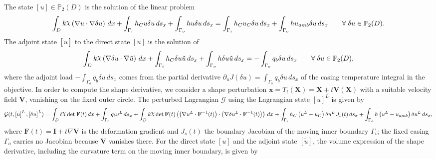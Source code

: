 \documentclass[preview]{standalone}
\let\oldcdot\cdot
\let\cdot\oldcdot
\begin{document}
The state $\left[ u\right] \in \mathbb P_{2}(D)$ is the solution of the linear problem
\begin{dmath*}
\int_{D} k \raisebox{\depth}{$\chi$} \left(  \nabla u  \cdot  \nabla \delta u  \right) \,dx + \int_{\Gamma_i} h_C u \delta u \,ds_x + \int_{\Gamma_o} h u \delta u \,ds_x = \int_{\Gamma_i} h_C u_{C} \delta u \,ds_x + \int_{\Gamma_o} h u_{amb} \delta u \,ds_x \qquad \forall\; {\delta u\in \mathbb P_{2}(D)} .
\end{dmath*}
The adjoint state $\left[ \tilde u\right]$ to the direct state $\left[ u\right]$ is the solution of
\begin{dmath*}
\int_{D} k \raisebox{\depth}{$\chi$} \left(  \nabla \delta u  \cdot  \nabla \tilde u  \right) \,dx + \int_{\Gamma_i} h_C \delta u \tilde u \,ds_x + \int_{\Gamma_o} h \delta u \tilde u \,ds_x = - \int_{\Gamma_o} q_b \delta u \,ds_x \qquad \forall\; {\delta u\in \mathbb P_{2}(D)} ,
\end{dmath*}
where the adjoint load $- \int_{\Gamma_o} q_b \delta u \,ds_x$ comes from the partial derivative $\partial_{u} J(\delta u) = \int_{\Gamma_o} q_b \delta u \,ds_x$ of the casing temperature integral in the objective.
In order to compute the shape derivative, we consider a shape perturbation $\mathbf x = T_t(\mathbf X) = \mathbf X + t \mathbf  V(\mathbf X)$ with a suitable velocity field $\mathbf V$, vanishing on the fixed outer circle.  The perturbed Lagrangian $\mathcal G$ using the Lagrangian state $\left[ u\right]^{L}$ is given by
\begin{dmath*}
\mathcal G(t,\left[ u\right]^{L},\left[ \delta u\right]^{L}) = \int_{D} \ell \raisebox{\depth}{$\chi$}  \operatorname{det}\mathbf F( t )  \,dx + \int_{\Gamma_o} q_b u^{L} \,ds_x +  \int_{D} k \raisebox{\depth}{$\chi$}  \operatorname{det}\mathbf F( t )  \left( \left(  \nabla u^{L} \cdot  \mathbf F^{-1}(t) \right) \cdot \left(  \nabla \delta u^{L} \cdot  \mathbf F^{-1}(t) \right) \right) \,dx + \int_{\Gamma_i} h_C \left( u^{L} - u_{C}\right) \delta u^{L} \,J_{s}(t) \,ds_x + \int_{\Gamma_o} h \left( u^{L} - u_{amb}\right) \delta u^{L} \,ds_x ,
\end{dmath*}
where $\mathbf F(t) = \mathbf I + t \nabla \mathbf V$ is the deformation gradient and $J_{s}(t)$ the boundary Jacobian of the moving inner boundary $\Gamma_i$; the fixed casing $\Gamma_o$ carries no Jacobian because $\mathbf V$ vanishes there.
For the direct state $\left[ u\right]$ and the adjoint state $\left[ \tilde u\right]$, the volume expression of the shape derivative, including the curvature term on the moving inner boundary, is given by
\end{document}

